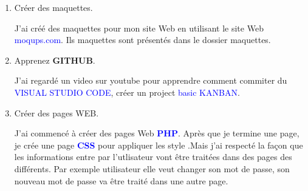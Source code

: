\documentclass{article}
\begin{document}
\begin{enumerate}
\begin{enumerate}
        
        
        
        
         \item \textcolor{amethyst}{Créer des maquettes}.
         
         \vspace{0.4cm}
                \setlength{\parindent}{1cm} J'ai créé des maquettes pour mon site Web en utilisant le site Web \textcolor{blue}{moqups.com}. Ils maquettes sont présentés dans le dossier maquettes.
         
\hspace*{-1.05in}
               \noindent{}         
         \vspace{1cm}
         \item \textcolor{amethyst}{Apprenez \textbf{GITHUB}}.
         
         \vspace{0.4cm}
                \setlength{\parindent}{1cm} J'ai regardé un video sur youtube pour apprendre comment commiter du \textcolor{blue}{VISUAL STUDIO CODE}, créer un project \textcolor{blue}{basic KANBAN}.
         \newpage
         \item \textcolor{amethyst}{Créer des pages WEB}.
         
         \vspace{0.4cm}
                \setlength{\parindent}{1cm} J'ai commencé à créer des pages Web \textcolor{blue}{\textbf{PHP}}. Après que je termine une page, je crée une page \textcolor{blue}{\textbf{CSS}} pour appliquer les style .Mais j'ai respecté la façon que les informations entre par l'utlisateur vont  être traitées dans des pages des différents. Par exemple utilisateur elle veut changer son mot de passe, son nouveau mot de passe va être traité dans une autre page.
         

\end{enumerate}
\end{enumerate}
\end{document}

